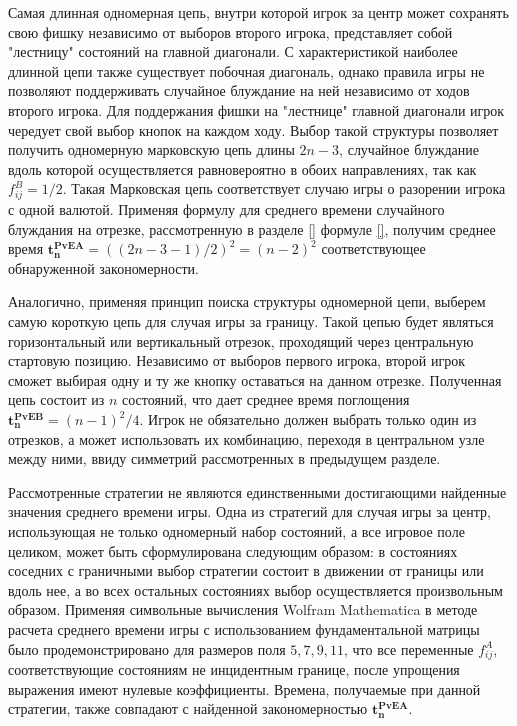 Самая длинная одномерная цепь, внутри которой игрок за центр может сохранять свою фишку независимо от выборов второго игрока, 
представляет собой "лестницу" состояний на главной диагонали. С характеристикой наиболее длинной цепи также существует побочная диагональ, однако
правила игры не позволяют поддерживать случайное блуждание на ней независимо от ходов второго игрока. 
Для поддержания фишки на "лестнице" главной диагонали игрок чередует свой выбор кнопок на каждом ходу.
Выбор такой структуры позволяет получить одномерную марковскую 
цепь длины $2n-3$, случайное блуждание вдоль которой осуществляется равновероятно в обоих направлениях, так как $f_{ij}^B=1/2$.
Такая Марковская цепь соответствует случаю игры о разорении игрока с одной валютой. Применяя формулу для среднего времени случайного блуждания на отрезке,
рассмотренную в разделе \cref{} формуле \cref{}, получим среднее время $\boldsymbol{t_n^{PvE A}} = ((2n-3-1)/2)^2 = (n-2)^2$ соответствующее обнаруженной закономерности.

Аналогично, применяя принцип поиска структуры одномерной цепи, выберем самую короткую цепь для случая игры за границу.
Такой цепью будет являться горизонтальный или вертикальный отрезок, проходящий через центральную стартовую позицию.
Независимо от выборов первого игрока, второй игрок сможет выбирая одну и ту же кнопку оставаться на данном отрезке.
Полученная цепь состоит из $n$ состояний, что дает среднее время поглощения $\boldsymbol{t_n^{PvE B}} = (n-1)^2/4$.
Игрок не обязательно должен выбрать только один из отрезков, а может использовать их комбинацию, переходя в центральном узле между ними,
ввиду симметрий рассмотренных в предыдущем разделе. 

Рассмотренные стратегии не являются единственными достигающими найденные значения среднего времени игры. 
Одна из стратегий для случая игры за центр, использующая не только одномерный набор состояний, а все игровое поле целиком, 
может быть сформулирована следующим образом: в состояниях соседних с граничными выбор стратегии состоит в движении от границы или вдоль нее, 
а во всех остальных состояниях выбор осуществляется произвольным образом. Применяя символьные вычисления Wolfram Mathematica
в методе расчета среднего времени игры с использованием фундаментальной матрицы было продемонстрировано для размеров поля
$5, 7, 9, 11$, что все переменные $f_{ij}^A$, соответствующие состояниям не инцидентным границе, после упрощения выражения имеют нулевые коэффициенты.
Времена, получаемые при данной стратегии, также совпадают с найденной закономерностью $\boldsymbol{t_n^{PvE A}}$.

